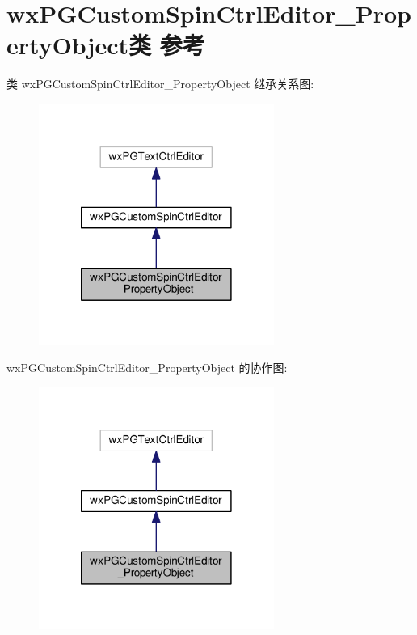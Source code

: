 \hypertarget{classwx_p_g_custom_spin_ctrl_editor___property_object}{\section{wx\+P\+G\+Custom\+Spin\+Ctrl\+Editor\+\_\+\+Property\+Object类 参考}
\label{classwx_p_g_custom_spin_ctrl_editor___property_object}
}


类 wx\+P\+G\+Custom\+Spin\+Ctrl\+Editor\+\_\+\+Property\+Object 继承关系图\+:
\nopagebreak
\begin{figure}[H]
\begin{center}
\leavevmode
\includegraphics[width=218pt]{classwx_p_g_custom_spin_ctrl_editor___property_object__inherit__graph}
\end{center}
\end{figure}


wx\+P\+G\+Custom\+Spin\+Ctrl\+Editor\+\_\+\+Property\+Object 的协作图\+:
\nopagebreak
\begin{figure}[H]
\begin{center}
\leavevmode
\includegraphics[width=218pt]{classwx_p_g_custom_spin_ctrl_editor___property_object__coll__graph}
\end{center}
\end{figure}
